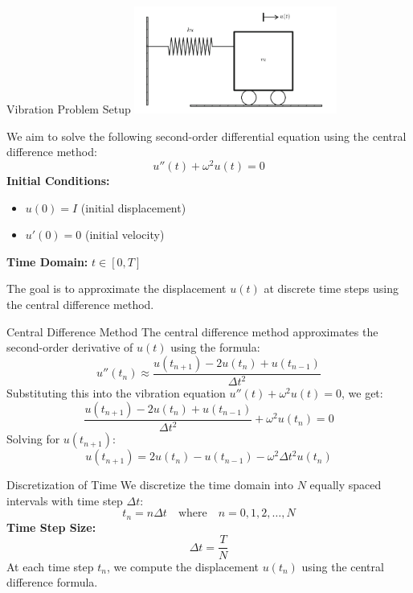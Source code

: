 \documentclass[10pt, aspectratio=54]{beamer}
\begin{document}
	\begin{frame}{Vibration Problem Setup}
		\centering
		\includegraphics[width=0.5\textwidth]{Figures/Vibrating_system_scheme.png} %
		
		
		We aim to solve the following second-order differential equation using the central difference method:
		\[
		u''(t) + \omega^2 u(t) = 0
		\]
		\textbf{Initial Conditions:}
		\begin{itemize}
			\item \( u(0) = I \)  \quad (initial displacement)
			\item \( u'(0) = 0 \) \quad (initial velocity)
		\end{itemize}
		\textbf{Time Domain:} \( t \in [0, T] \)
		
		\vspace{0.3cm}
		The goal is to approximate the displacement \( u(t) \) at discrete time steps using the central difference method.
	\end{frame}
	
	\begin{frame}{Central Difference Method}
		\justifying
		The central difference method approximates the second-order derivative of \( u(t) \) using the formula:
		\[
		u''(t_n) \approx \frac{u(t_{n+1}) - 2u(t_n) + u(t_{n-1})}{\Delta t^2}
		\]
		Substituting this into the vibration equation \( u''(t) + \omega^2 u(t) = 0 \), we get:
		\[
		\frac{u(t_{n+1}) - 2u(t_n) + u(t_{n-1})}{\Delta t^2} + \omega^2 u(t_n) = 0
		\]
		Solving for \( u(t_{n+1}) \):
		\[
		u(t_{n+1}) = 2u(t_n) - u(t_{n-1}) - \omega^2 \Delta t^2 u(t_n)
		\]
	\end{frame}
	
	\begin{frame}{Discretization of Time}
		\justifying
		We discretize the time domain into \( N \) equally spaced intervals with time step \( \Delta t \):
		\[
		t_n = n \Delta t \quad \text{where} \quad n = 0, 1, 2, \ldots, N
		\]
		\textbf{Time Step Size:}
		\[
		\Delta t = \frac{T}{N}
		\]
		At each time step \( t_n \), we compute the displacement \( u(t_n) \) using the central difference formula.
	\end{frame}
	
\end{document}
